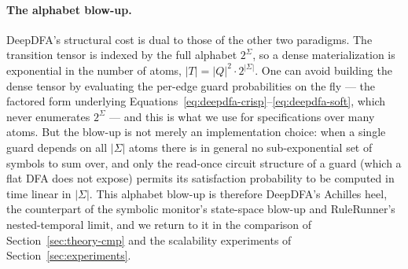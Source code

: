 \paragraph{The alphabet blow-up.}
DeepDFA's structural cost is dual to those of the other two paradigms. The transition tensor is indexed by the full alphabet $2^\Sigma$, so a dense materialization is exponential in the number of atoms, $|T| = |Q|^2 \cdot 2^{|\Sigma|}$. One can avoid building the dense tensor by evaluating the per-edge guard probabilities on the fly --- the factored form underlying Equations~\eqref{eq:deepdfa-crisp}--\eqref{eq:deepdfa-soft}, which never enumerates $2^\Sigma$ --- and this is what we use for specifications over many atoms. But the blow-up is not merely an implementation choice: when a single guard depends on all $|\Sigma|$ atoms there is in general no sub-exponential set of symbols to sum over, and only the read-once circuit structure of a guard (which a flat DFA does not expose) permits its satisfaction probability to be computed in time linear in $|\Sigma|$. This alphabet blow-up is therefore DeepDFA's Achilles heel, the counterpart of the symbolic monitor's state-space blow-up and RuleRunner's nested-temporal limit, and we return to it in the comparison of Section~\ref{sec:theory-cmp} and the scalability experiments of Section~\ref{sec:experiments}.
